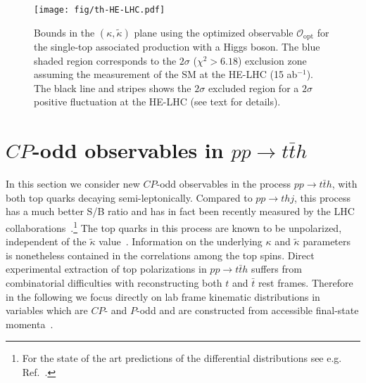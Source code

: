 \documentclass[11pt,a4paper]{article}
\newcommand{\mc}[1]{\mathcal{#1}}
\begin{document}
\begin{figure}[t!]
	\centering 	
	\texttt{[image: fig/th-HE-LHC.pdf]}
	\caption{Bounds in the $(\kappa, \tilde{\kappa})$ plane using the optimized observable $\mc{O}_\mathrm{opt}$ for the single-top associated production with a Higgs boson. The blue shaded region corresponds to the $2\sigma$ ($\chi^2 > 6.18$) exclusion zone assuming the measurement of the SM at the HE-LHC (15 ab$^{-1}$). The black line and stripes shows the $2\sigma$ excluded region for a $2\sigma$ positive fluctuation at the HE-LHC (see text for details).}
	\label{fig:th-HE-LHC}
\end{figure}

%
\section{$CP$-odd observables in $pp \to t \bar{t} h$}\label{sec:tth}
%
In this section we consider new $CP$-odd observables in the process $p p \to t \bar{t} h$, with both top quarks decaying semi-leptonically. Compared to $p p \to t  h j$, this process has a much better S/B ratio and has in fact been recently measured by the LHC collaborations~\cite{1712.08895, 1806.00425}.\footnote{For the state of the art predictions of the differential distributions see e.g. Ref.~\cite{1907.04343}.} 
The top quarks in this process are known to be unpolarized, independent of the $\tilde \kappa$ value~\cite{Ellis:2013yxa}. Information on the underlying $\kappa$ and $\tilde\kappa$ parameters is nonetheless contained in the correlations among the top spins. Direct experimental extraction of top polarizations in $p p \to t \bar{t} h$ suffers from combinatorial difficulties with reconstructing both $t$ and $\bar t$ rest frames. Therefore in the following we focus directly on lab frame kinematic distributions in variables which are $CP$- and $P$-odd and are constructed from accessible final-state momenta~\cite{Boudjema:2015nda}.


\end{document}
